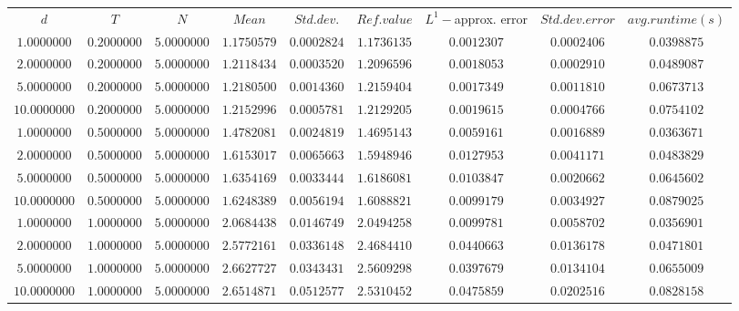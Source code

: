 \begin{tabular}{ccccccccc}
$d$ & $T$ & $N$ & $Mean$ & $Std. dev.$ & $Ref. value$ & $L^1-$approx. error & $Std. dev. error$ & $avg. runtime (s)$\\
$1.0000000$ & $0.2000000$ & $5.0000000$ & $1.1750579$ & $0.0002824$ & $1.1736135$ & $0.0012307$ & $0.0002406$ & $0.0398875$\\
$2.0000000$ & $0.2000000$ & $5.0000000$ & $1.2118434$ & $0.0003520$ & $1.2096596$ & $0.0018053$ & $0.0002910$ & $0.0489087$\\
$5.0000000$ & $0.2000000$ & $5.0000000$ & $1.2180500$ & $0.0014360$ & $1.2159404$ & $0.0017349$ & $0.0011810$ & $0.0673713$\\
$10.0000000$ & $0.2000000$ & $5.0000000$ & $1.2152996$ & $0.0005781$ & $1.2129205$ & $0.0019615$ & $0.0004766$ & $0.0754102$\\
$1.0000000$ & $0.5000000$ & $5.0000000$ & $1.4782081$ & $0.0024819$ & $1.4695143$ & $0.0059161$ & $0.0016889$ & $0.0363671$\\
$2.0000000$ & $0.5000000$ & $5.0000000$ & $1.6153017$ & $0.0065663$ & $1.5948946$ & $0.0127953$ & $0.0041171$ & $0.0483829$\\
$5.0000000$ & $0.5000000$ & $5.0000000$ & $1.6354169$ & $0.0033444$ & $1.6186081$ & $0.0103847$ & $0.0020662$ & $0.0645602$\\
$10.0000000$ & $0.5000000$ & $5.0000000$ & $1.6248389$ & $0.0056194$ & $1.6088821$ & $0.0099179$ & $0.0034927$ & $0.0879025$\\
$1.0000000$ & $1.0000000$ & $5.0000000$ & $2.0684438$ & $0.0146749$ & $2.0494258$ & $0.0099781$ & $0.0058702$ & $0.0356901$\\
$2.0000000$ & $1.0000000$ & $5.0000000$ & $2.5772161$ & $0.0336148$ & $2.4684410$ & $0.0440663$ & $0.0136178$ & $0.0471801$\\
$5.0000000$ & $1.0000000$ & $5.0000000$ & $2.6627727$ & $0.0343431$ & $2.5609298$ & $0.0397679$ & $0.0134104$ & $0.0655009$\\
$10.0000000$ & $1.0000000$ & $5.0000000$ & $2.6514871$ & $0.0512577$ & $2.5310452$ & $0.0475859$ & $0.0202516$ & $0.0828158$\\
\end{tabular}
